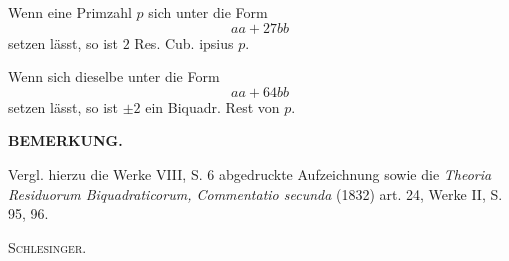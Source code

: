 \NoSourceHead
{}
\par\indent Wenn eine Primzahl $p$ sich unter die Form
\[
aa+27bb
\]
\noindent setzen lässt, so ist $2$ Res. Cub. ipsius $p$.

Wenn sich dieselbe unter die Form
\[
aa+64bb
\]
\noindent setzen lässt, so ist $\pm2$ ein Biquadr. Rest von $p$.
\begin{center}\textbf{BEMERKUNG.}\end{center}
\begingroup\small
\par\indent Vergl. hierzu die Werke VIII, S. 6 abgedruckte Aufzeichnung sowie die \textit{Theoria Residuorum Biquadraticorum, Commentatio secunda} (1832) art. 24, Werke II, S. 95, 96.
\begin{flushright}\textsc{Schlesinger.}\end{flushright}
\ClosingRule\clearpage\endgroup

